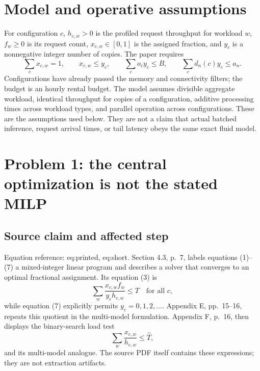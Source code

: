 \documentclass[10pt]{article}
\begin{document}
\section*{Model and operative assumptions}
For configuration \(c\), \(h_{c,w}>0\) is the profiled request throughput for workload \(w\), \(f_w\geq0\) is its request count, \(x_{c,w}\in[0,1]\) is the assigned fraction, and \(y_c\) is a nonnegative integer number of copies. The paper requires \[\sum_c x_{c,w}=1,\qquad x_{c,w}\leq y_c,
 \qquad \sum_c o_cy_c\leq B,\qquad
 \sum_c d_n(c)y_c\leq a_n .\] Configurations have already passed the memory and connectivity filters; the budget is an hourly rental budget. The model assumes divisible aggregate workload, identical throughput for copies of a configuration, additive processing times across workload types, and parallel operation across configurations. These are the assumptions used below. They are not a claim that actual batched inference, request arrival times, or tail latency obeys the same exact fluid model.\par
\section*{Problem 1: the central optimization is not the stated MILP}
\subsection*{Source claim and affected step}
Equation reference: eq:printed, eq:short. Section 4.3, p. 7, labels equations (1)–(7) a mixed-integer linear program and describes a solver that converges to an optimal fractional assignment. Its equation (3) is \[
 \sum_w\frac{x_{c,w}f_w}{y_ch_{c,w}}\leq T
 \quad\text{for all }c ,\] while equation (7) explicitly permits \(y_c=0,1,2,\ldots\). Appendix E, pp. 15–16, repeats this quotient in the multi-model formulation. Appendix F, p. 16, then displays the binary-search load test \[
 \sum_w\frac{x_{c,w}}{h_{c,w}}\leq \widehat T ,\] and its multi-model analogue. The source PDF itself contains these expressions; they are not extraction artifacts.\par
\end{document}
